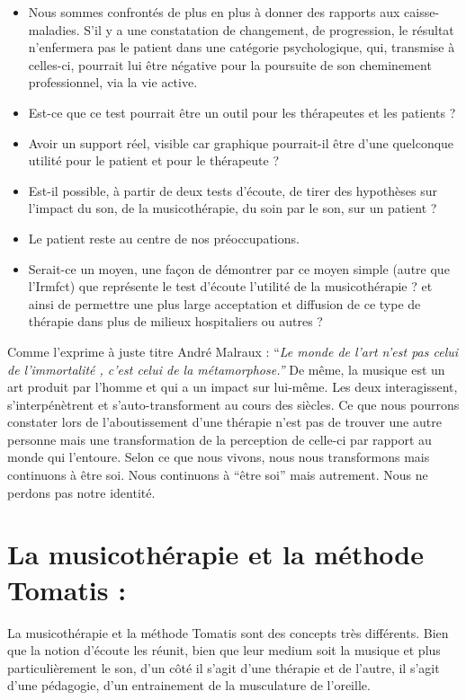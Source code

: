 \begin{itemize}
\item Nous sommes confrontés de plus en plus à donner des rapports aux caisse-maladies.
S'il y a une constatation de changement, de progression, le résultat
n'enfermera pas le patient dans une catégorie psychologique, qui,
transmise à celles-ci, pourrait lui être négative pour la poursuite
de son cheminement professionnel, via la vie active. 
\item Est-ce que ce test pourrait être un outil pour les thérapeutes et
les patients ? 
\item Avoir un support réel, visible car graphique pourrait-il être d'une
quelconque utilité pour le patient et pour le thérapeute ?
\item Est-il possible, à partir de deux tests d'écoute, de tirer des hypothèses
sur l'impact du son, de la musicothérapie, du soin par le son, sur
un patient ?
\item Le patient reste au centre de nos préoccupations.
\item Serait-ce un moyen, une façon de démontrer par ce moyen simple (autre
que l'Irmfct) que représente le test d'écoute l'utilité de la musicothérapie
? et ainsi de permettre une plus large acceptation et diffusion de
ce type de thérapie dans plus de milieux hospitaliers ou autres ?


\end{itemize}

Comme l'exprime à juste titre André Malraux : ``\emph{Le monde de
	l'art n'est pas celui de l'immortalité , c'est celui de la métamorphose.''}
De même, la musique est un art produit par l'homme et qui a un impact
sur lui-même. Les deux interagissent, s'interpénètrent et s'auto-transforment
au cours des siècles. Ce que nous pourrons constater lors de l'aboutissement
d'une thérapie n'est pas de trouver une autre personne mais une transformation
de la perception de celle-ci par rapport au monde qui l'entoure. Selon
ce que nous vivons, nous nous transformons mais continuons à être
soi. Nous continuons à ``être soi'' mais autrement. Nous ne perdons
pas notre identité.

\section{La musicothérapie et la méthode Tomatis : }
La musicothérapie et la méthode Tomatis sont des concepts très différents. Bien que la notion d'écoute les réunit, bien que leur medium soit la musique et plus particulièrement le son, d'un côté il s'agit d'une thérapie et de l'autre, il s'agit d'une pédagogie, d'un entrainement de la musculature de l'oreille. 